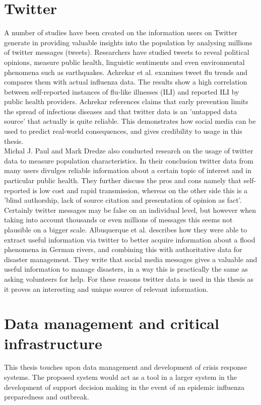\section{Twitter}
A number of studies have been created on the information users on Twitter generate in providing valuable insights into the population by analysing millions of twitter messages (tweets). Researchers have studied tweets to reveal political opinions\cite{twitter_politic}, measure public health\cite{twitter_flu_trends}, linguistic sentiments\cite{twitter_linguistics} and even environmental phenomena such as earthquakes\cite{twitter_earthQuake}. Achrekar et al.\cite{twitter_flu_trends} examines tweet flu trends and compares them with actual influenza data. The results show a high correlation between self-reported instances of flu-like illnesses (ILI) and reported ILI by public health providers. Achrekar references claims that early prevention limits the spread of infectious diseases and that twitter data is an 'untapped data source' that actually is quite reliable. This demonstrates how social media can be  used to predict real-world consequences, and gives credibility to usage in this thesis. \\Michal J. Paul and Mark Dredze \cite{twitter_what_you_tweet} also conducted research on the usage of twitter data to measure population characteristics. In their conclusion twitter data from many users divulges reliable information about a certain topic of interest and in particular public health. They further discuss the pros and cons namely that self-reported is low cost and rapid transmission, whereas on the other side this is a 'blind authorship, lack of source citation and presentation of opinion as fact'. Certainly twitter messages may be false on an individual level, but however when taking into account thousands or even millions of messages this seems not plausible on a bigger scale. Albuquerque et al. \cite{de2015geographic} describes how they were able to extract useful information via twitter to better acquire information about a flood phenomena in German rivers, and combining this with authoritative data for disaster management. They write that social media messages gives a valuable and useful information to manage disasters, in a way this is practically the same as asking volunteers for help. For these reasons twitter data is used in this thesis as it proves an interesting and unique source of relevant information.

\section{Data management and critical infrastructure}
This thesis touches upon data management and development of crisis response systems. The proposed system would act as a tool in a larger system in the development of support decision making in the event of an epidemic influenza preparedness and outbreak. 

